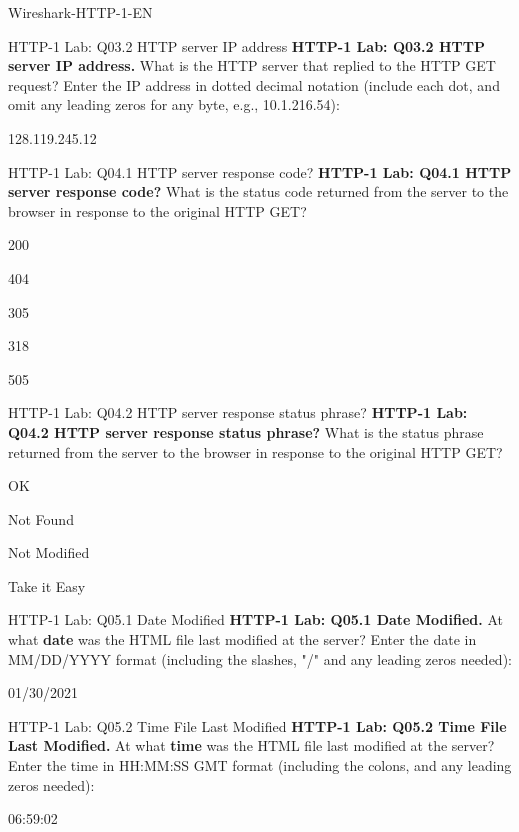 \documentclass[a4paper]{article}
\begin{document}
\begin{quiz}{Wireshark-HTTP-1-EN}
\begin{shortanswer}[points=1]{HTTP-1 Lab: Q03.2 HTTP server IP address}
\textbf{HTTP-1 Lab: Q03.2 HTTP server IP address.} What is the HTTP server that replied to the HTTP GET request? Enter the IP address in dotted decimal notation (include each dot, and omit any leading zeros for any byte, e.g., 10.1.216.54): 
\item 128.119.245.12
\end{shortanswer}

\begin{multi}[points=1,shuffle]{HTTP-1 Lab: Q04.1 HTTP server response code?}
\textbf{HTTP-1 Lab: Q04.1 HTTP server response code?} What is the status code returned from the server to the browser in response to the original HTTP GET? 
\item* 200
\item 404
\item 305
\item 318
\item 505
\end{multi}

\begin{multi}[points=1,shuffle]{HTTP-1 Lab: Q04.2 HTTP server response status phrase?}
\textbf{HTTP-1 Lab: Q04.2 HTTP server response status phrase?} What is the status phrase returned from the server to the browser in response to the original HTTP GET? 
\item* OK
\item Not Found
\item Not Modified
\item Take it Easy
\end{multi}

\begin{shortanswer}[points=1]{HTTP-1 Lab: Q05.1 Date Modified}
\textbf{HTTP-1 Lab: Q05.1 Date Modified.} At what \textbf{date} was the HTML file last modified at the server? Enter the date in MM/DD/YYYY format (including the slashes, "/" and any leading zeros needed):
\item 01/30/2021
\end{shortanswer}

\begin{shortanswer}[points=1]{HTTP-1 Lab: Q05.2 Time File Last Modified}
\textbf{HTTP-1 Lab: Q05.2 Time File Last Modified.} At what \textbf{time} was the HTML file last modified at the server? Enter the time in HH:MM:SS GMT format (including the colons, and any leading zeros needed):
\item 06:59:02
\end{shortanswer}


\end{quiz}
\end{document}

